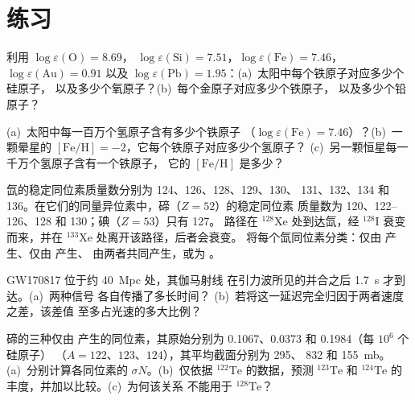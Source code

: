\section{练习}

\begin{exercise}[$\star$]\label{exo:b3:origin-of-elements:1}
利用 $\log\varepsilon(\mathrm{O}) = 8.69$，
$\log\varepsilon(\mathrm{Si}) = 7.51$，$\log\varepsilon(\mathrm{Fe}) =
7.46$，$\log\varepsilon(\mathrm{Au}) = 0.91$ 以及
$\log\varepsilon(\mathrm{Pb}) = 1.95$：(a)~太阳中每个铁原子对应多少个硅原子，
以及多少个氧原子？(b)~每个金原子对应多少个铁原子，
以及多少个铅原子？
\end{exercise}

\begin{exercise}[$\star$]\label{exo:b3:origin-of-elements:2}
(a)~太阳中每一百万个氢原子含有多少个铁原子
（$\log\varepsilon(\mathrm{Fe}) = 7.46$）？(b)~一颗晕星的
$[\mathrm{Fe/H}] = -2$，它每个铁原子对应多少个氢原子？
(c)~另一颗恒星每一千万个氢原子含有一个铁原子，
它的 $[\mathrm{Fe/H}]$ 是多少？
\end{exercise}

\begin{exercise}[$\star$]\label{exo:b3:origin-of-elements:3}
氙的稳定同位素质量数分别为 124、126、128、129、130、
131、132、134 和 136。在它们的同量异位素中，碲（$Z = 52$）的稳定同位素
质量数为 120、122--126、128 和 130；碘（$Z = 53$）只有 127。
路径在 $^{128}\mathrm{Xe}$ 处到达氙，经
$^{128}\mathrm{I}$ 衰变而来，并在 $^{133}\mathrm{Xe}$ 处离开该路径，后者会衰变。
将每个氙同位素分类：仅由 产生、仅由 产生、
由两者共同产生，或为 。
\end{exercise}

\begin{exercise}[$\star$]\label{exo:b3:origin-of-elements:4}
GW170817 位于约 \qty{40}{Mpc} 处，其伽马射线
在引力波所见的并合之后 \qty{1.7}{s} 才到达。(a)~两种信号
各自传播了多长时间？
(b)~若将这一延迟完全归因于两者速度之差，该差值
至多占光速的多大比例？
\end{exercise}

\begin{exercise}[$\star\star$]\label{exo:b3:origin-of-elements:5}
碲的三种仅由 产生的同位素，其原始分别为
\num{0.1067}、\num{0.0373} 和 \num{0.1984}（每 $10^6$ 个硅原子）
（$A = 122$、$123$、$124$），其平均截面分别为 \num{295}、
\num{832} 和 \qty{155}{mb}。(a)~分别计算各同位素的 $\sigma N$。(b)~仅依据
$^{122}\mathrm{Te}$ 的数据，预测 $^{123}\mathrm{Te}$
和 $^{124}\mathrm{Te}$ 的丰度，并加以比较。(c)~为何该关系
不能用于 $^{128}\mathrm{Te}$？
\end{exercise}

